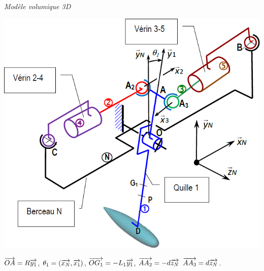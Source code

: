 \documentclass[10pt,fleqn]{article} %
\begin{document}
\begin{multicols}{2}
\begin{center}
\textit{Modèle volumique 3D}
\end{center}

\begin{center}
\includegraphics[width=\linewidth]{images/fig_04}


$\overrightarrow{OA}=R\overrightarrow{y_1}$, 
$\theta_1 =\left(\overrightarrow{x_N},\overrightarrow{x_1}\right)$,
$\overrightarrow{OG_1}=-L_1\overrightarrow{y_1}$,
$\overrightarrow{AA_2}=-d\overrightarrow{z_N}$
$\overrightarrow{AA_3}=d\overrightarrow{z_N} $.



\end{center}
\end{multicols}
\end{document}
